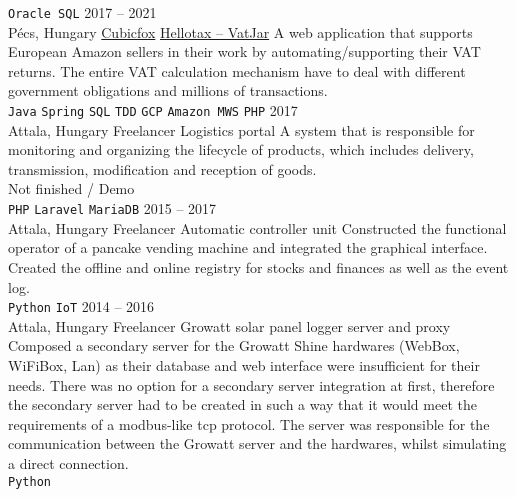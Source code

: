 \documentclass[9pt]{developercv} %
\begin{document}
\begin{entrylist}
{            \texttt{Oracle SQL}
        }
    \entry
        {2017 -- 2021 \\ Pécs, Hungary}
        {\href{https://cubicfox.com/}{Cubicfox}}
        {\href{https://app.hellotax.com}{Hellotax -- VatJar}}
        {A web application that supports European Amazon sellers in their work by automating/supporting their VAT returns.
            The entire VAT calculation mechanism have to deal with different government obligations and millions of transactions. \\
            \texttt{Java}\slashsep
            \texttt{Spring}\slashsep
            \texttt{SQL}\slashsep
            \texttt{TDD}\slashsep
            \texttt{GCP}\slashsep
            \texttt{Amazon MWS}\slashsep
            \texttt{PHP}
        }
    \entry
        {2017 \\ Attala, Hungary}
        {Freelancer}
        {Logistics portal}
        {A system that is responsible for monitoring and organizing the lifecycle of products, which includes delivery,
            transmission, modification and reception of goods.\\
            Not finished / Demo \\
            \texttt{PHP}\slashsep
            \texttt{Laravel}\slashsep
            \texttt{MariaDB}
        }
    \entry
        {2015 -- 2017 \\ Attala, Hungary}
        {Freelancer}
        {Automatic controller unit}
        {Constructed the functional operator of a pancake vending machine and integrated the graphical interface. Created the
            offline and online registry for stocks and finances as well as the event log.\\
            \texttt{Python}\slashsep
            \texttt{IoT}
        }
    \entry
        {2014 -- 2016 \\ Attala, Hungary}
        {Freelancer}
        {Growatt solar panel logger server and proxy}
        {Composed a secondary server for the Growatt Shine hardwares (WebBox, WiFiBox, Lan) as their database and web
            interface were insufficient for their needs. There was no option for a secondary server integration at first, therefore the
            secondary server had to be created in such a way that it would meet the requirements of a modbus-like tcp protocol.
            The server was responsible for the communication between the Growatt server and the hardwares, whilst simulating a
            direct connection. \\
            \texttt{Python}\slashsep
}
\end{entrylist}
\end{document}
